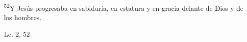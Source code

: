 \documentclass[../../rosario.tex]{subfiles}
\begin{document}
    \textsuperscript{52}Y Jesús progresaba en sabiduría, en estatura y en gracia delante de Dios y de los hombres.
    \begin{flushright}
    Lc. 2, 52        
    \end{flushright}
\end{document}
